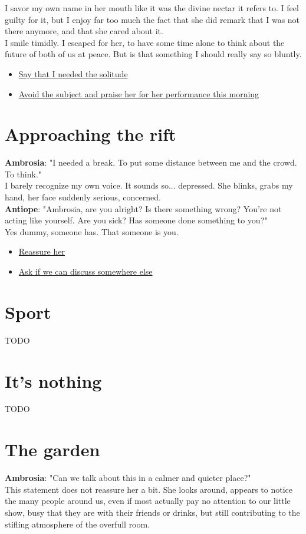 \documentclass{report}
\newcommand{\speaker}[1]{
	\textbf{#1}: 
}
\newcommand{\glink}[2]{
	\hyperref[#1]{#2}
}
\newcommand{\gsection}[1]{
	\section*{#1}
	\label{#1}
}
\begin{document}
I savor my own name in her mouth like it was the divine nectar it refers to. I feel guilty for it, but I enjoy far too much the fact that she did remark that I was not there anymore, and that she cared about it.\\

I smile timidly. I escaped for her, to have some time alone to think about the future of both of us at peace. But is that something I should really say so bluntly.

\begin{itemize}
	\item \glink{Approaching the rift}{Say that I needed the solitude}
	\item \glink{Sport}{Avoid the subject and praise her for her performance this morning}
\end{itemize}

\gsection{Approaching the rift}

\speaker{Ambrosia} "I needed a break. To put some distance between me and the crowd. To think."\\

I barely recognize my own voice. It sounds so... depressed. She blinks, grabs my hand, her face suddenly serious, concerned.\\

\speaker{Antiope} "Ambrosia, are you alright? Is there something wrong? You're not acting like yourself. Are you sick? Has someone done something to you?"\\

Yes dummy, someone has. That someone is you.

\begin{itemize}
	\item \glink{It's nothing}{Reassure her}
	\item \glink{The garden}{Ask if we can discuss somewhere else}
\end{itemize}

\gsection{Sport}

TODO

\gsection{It's nothing}

TODO

\gsection{The garden}

\speaker{Ambrosia} "Can we talk about this in a calmer and quieter place?"\\

This statement does not reassure her a bit. She looks around, appears to notice the many people around us, even if most actually pay no attention to our little show, busy that they are with their friends or drinks, but still contributing to the stifling atmosphere of the overfull room.\\
\end{document}
